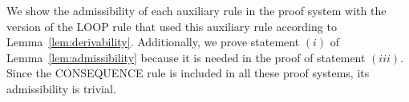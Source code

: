 \documentclass[runningheads]{llncs}       %
\begin{document}
We show the admissibility of each auxiliary rule in the proof system
with the version of the LOOP rule that used this auxiliary rule 
according to Lemma~\ref{lem:derivability}. 
Additionally, we prove statement $(i)$ of Lemma~\ref{lem:admissibility} 
because it is needed in the proof of statement $(iii)$.
Since the CONSEQUENCE rule is included in all these proof systems,
its admissibility is trivial.




    
   
        
   
  
   

         
         
   
   

\end{document}
